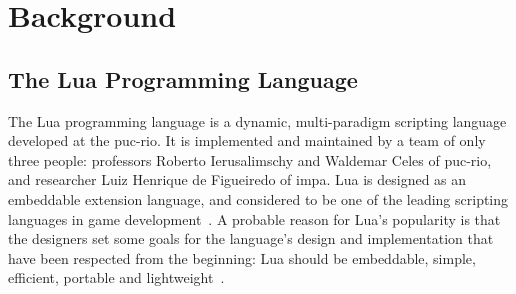 \chapter{Background}
\label{chp:background}

\section{The Lua Programming Language}
\label{sec:lua_language}
The Lua programming language is a dynamic, multi-paradigm scripting language developed at the \gls{puc-rio}. It is implemented and maintained by a team of only three people: professors Roberto Ierusalimschy and Waldemar Celes of \gls{puc-rio}, and researcher Luiz Henrique de Figueiredo of \gls{impa}. Lua is designed as an embeddable extension language, and considered to be one of the leading scripting languages in game development~\cite{inproceedings:the_evolution_of_lua}. A probable reason for Lua's popularity is that the designers set some goals for the language's design and implementation that have been respected from the beginning: Lua should be embeddable, simple, efficient, portable and lightweight~\cite{article:the_implementation_of_lua}.

